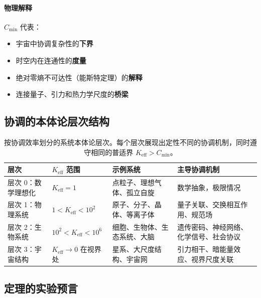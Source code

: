 \documentclass[11pt,a4paper]{article}
\begin{document}
	\paragraph{物理解释}
	$C_{\min}$ 代表：
	\begin{itemize}
		\item 宇宙中协调复杂性的\textbf{下界}
		\item 时空内在连通性的\textbf{度量}
		\item 绝对零熵不可达性（能斯特定理）的\textbf{解释}
		\item 连接量子、引力和热力学尺度的\textbf{桥梁}
	\end{itemize}
	
	\subsection{协调的本体论层次结构}
	
	\begin{table}[htbp]
		\centering
		\small
		\begin{tabular}{|p{}|p{}|p{}|p{}|}
			\hline
			\textbf{层次} & \textbf{$K_{\mathrm{eff}}$ 范围} & \textbf{示例系统} & \textbf{主导协调机制} \\
			\hline
			层次 0：数学理想化 & $K_{\mathrm{eff}} = 1$ & 点粒子、理想气体、孤立自旋 & 数学抽象，极限情况 \\
			\hline
			层次 1：物理系统 & $1 < K_{\mathrm{eff}} < 10^2$ & 原子、分子、晶体、等离子体 & 量子关联、交换相互作用、规范场 \\
			\hline
			层次 2：生物系统 & $10^2 < K_{\mathrm{eff}} < 10^6$ & 细胞、生物体、生态系统、大脑 & 遗传密码、神经网络、化学信号、社会协议 \\
			\hline
			层次 3：宇宙结构 & $K_{\mathrm{eff}} \to 0$ 在视界处 & 星系、大尺度结构、宇宙网 & 引力相干、暗能量效应、视界尺度关联 \\
			\hline
		\end{tabular}
		\caption{按协调效率划分的系统本体论层次。每个层次展现出定性不同的协调机制，同时遵守相同的普适界 $K_{\mathrm{eff}} > C_{\min}$。}
		\label{tab:ontology-hierarchy}
	\end{table}
	
	\subsection{定理的实验预言}
	
\end{document}
